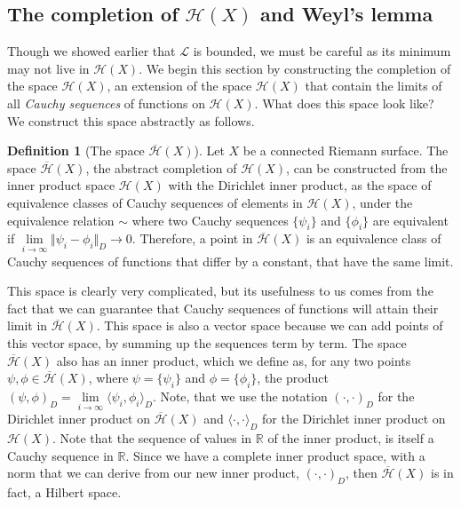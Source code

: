 \documentclass[11pt]{report}
\theoremstyle{definition}
\newtheorem{defn}[thm]{Definition}
\begin{document}
\subsection{The completion of $\mathcal{H}(X)$ and Weyl's lemma}\label{Hilbertsraumsection}
Though we showed earlier that $\mathcal{L}$ is bounded, we must be careful as its minimum may not live in $\mathcal{H}(X)$. We begin this section by constructing the completion of the space $\mathcal{H}(X)$, an extension of the space $\mathcal{H}(X)$ that contain the limits of all \emph{Cauchy sequences} of functions on $\mathcal{H}(X)$. What does this space look like? We construct this space abstractly as follows.
\begin{defn}[The space $\overline{\mathcal{H}}(X)$]\label{completeH}
  Let $X$ be a connected Riemann surface. The space $\overline{\mathcal{H}}(X)$, the abstract completion of $\mathcal{H}(X)$, can be constructed from the inner product space $\mathcal{H}(X)$ with the Dirichlet inner product, as the space of equivalence classes of Cauchy sequences of elements in $\mathcal{H}(X)$, under the equivalence relation $\sim$ where two Cauchy sequences $\{\psi_i\}$ and $\{\phi_i\}$ are equivalent if $\lim\limits_{i \rightarrow \infty}\Vert \psi_i - \phi_i\Vert_D \rightarrow 0 $.
  Therefore, a point in $\overline{\mathcal{H}}(X)$ is an equivalence class of Cauchy sequences of functions that differ by a constant, that have the same limit.
\end{defn}
This space is clearly very complicated, but its usefulness to us comes from the fact that we can guarantee that Cauchy sequences of functions will attain their limit in $\overline{\mathcal{H}}(X)$. This space is also a vector space because we can add points of this vector space, by summing up the sequences term by term. The space $\overline{\mathcal{H}}(X)$ also has an inner product, which we define as, for any two points $\psi, \phi \in \overline{\mathcal{H}}(X)$, where $\psi = \{\psi_i\}$ and $\phi = \{\phi_i\}$, the product $( \psi, \phi )_D = \lim\limits_{i \rightarrow \infty} \langle \psi_i, \phi_i \rangle_D$. Note, that we use the notation $( \cdot, \cdot)_D$ for the Dirichlet inner product on $\overline{\mathcal{H}}(X)$ and $\langle \cdot, \cdot \rangle_D$ for the Dirichlet inner product on $\mathcal{H}(X)$. Note that the sequence of values in $\mathbb{R}$ of the inner product, is itself a Cauchy sequence in $\mathbb{R}$. Since we have a complete inner product space, with a norm that we can derive from our new inner product, $( \cdot, \cdot )_D$, then $\overline{\mathcal{H}}(X)$ is in fact, a Hilbert space. 
\end{document}
